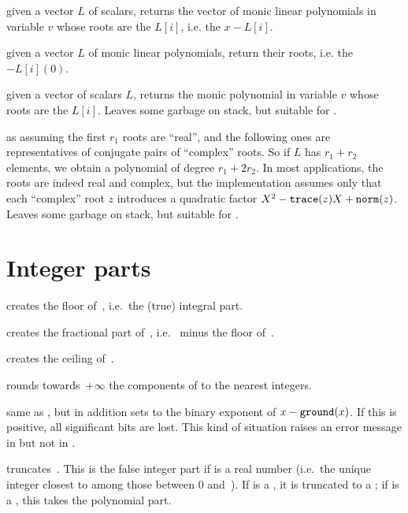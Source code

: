 
 given a vector $L$ of scalars,
returns the vector of monic linear polynomials in variable $v$ whose roots
are the $L[i]$, i.e. the $x - L[i]$.

 given a vector $L$ of monic linear
polynomials, return their roots, i.e. the $- L[i](0)$.

 given a vector of scalars $L$,
returns the monic polynomial in variable $v$ whose roots are the $L[i]$.
Leaves some garbage on stack, but suitable for .

 as 
assuming the first $r_1$ roots are ``real'', and the following ones are
representatives of conjugate pairs of ``complex'' roots. So if $L$ has $r_1 +
r_2$ elements, we obtain a polynomial of degree $r_1 + 2r_2$. In most
applications, the roots are indeed real and complex, but the implementation
assumes only that each ``complex'' root $z$ introduces a quadratic
factor $X^2 - {\tt trace}(z) X + {\tt norm}(z)$.
Leaves some garbage on stack, but suitable for .

\section{Integer parts}

 creates the floor of~, i.e.\ the (true)
integral part.

 creates the fractional part of~, i.e.\ 
minus the floor of~.

 creates the ceiling of~.

 rounds towards~$+\infty$ the components of 
to the nearest integers.

 same as , but in addition sets
 to the binary exponent of $x - {\tt ground}(x)$. If this is
positive, all significant bits are lost. This kind of situation raises an
error message in  but not in .

 truncates~. This is the false integer part
if  is a real number (i.e.~the unique integer closest to  among
those between 0 and~). If  is a , it is truncated
to a ; if  is a , this takes the polynomial part.

